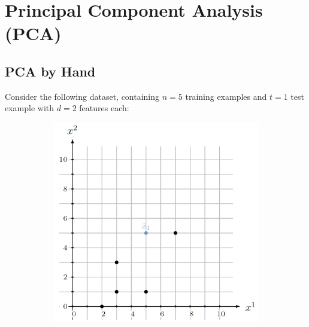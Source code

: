 \documentclass{article}
\begin{document}
\pagebreak

\section{Principal Component Analysis (PCA)}

\subsection{PCA by Hand}

Consider the following dataset, containing $n=5$ training examples and $t=1$ test example with $d=2$ features each:\\



\begin{figure}[h]
  \centering
  \begin{subfigure}[b]{0.4\linewidth}
      \centering
      \includegraphics[scale=0.5]{figs/PCAbyHand1}
  \end{subfigure}
  \quad
  \begin{subfigure}[t]{0.4\linewidth}
      \centering
  \end{subfigure}
\end{figure}
\end{document}
